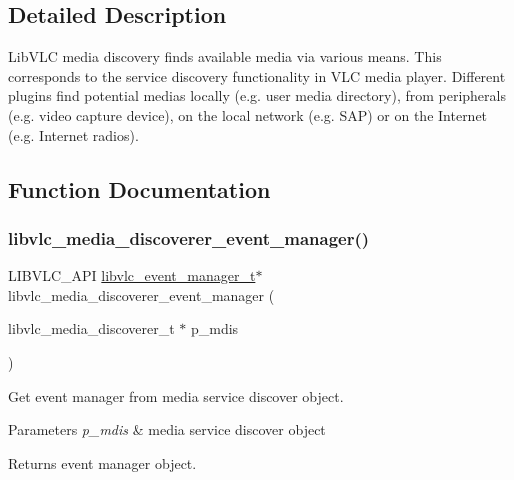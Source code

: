 \subsection{Detailed Description}
Lib\+V\+LC media discovery finds available media via various means. This corresponds to the service discovery functionality in V\+LC media player. Different plugins find potential medias locally (e.\+g. user media directory), from peripherals (e.\+g. video capture device), on the local network (e.\+g. S\+AP) or on the Internet (e.\+g. Internet radios). 

\subsection{Function Documentation}
\mbox{\label{group__libvlc__media__discoverer_ga60cca8ee74b3dd433f447436ca3e2578}} 
\subsubsection{\texorpdfstring{libvlc\+\_\+media\+\_\+discoverer\+\_\+event\+\_\+manager()}{libvlc\_media\_discoverer\_event\_manager()}}
{\footnotesize\ttfamily L\+I\+B\+V\+L\+C\+\_\+\+A\+PI \hyperlink{group__libvlc__event_gaa82f247503d3558b9117550e8d3c9259}{libvlc\+\_\+event\+\_\+manager\+\_\+t}$\ast$ libvlc\+\_\+media\+\_\+discoverer\+\_\+event\+\_\+manager (\begin{DoxyParamCaption}\item[{libvlc\+\_\+media\+\_\+discoverer\+\_\+t $\ast$}]{p\+\_\+mdis }\end{DoxyParamCaption})}

Get event manager from media service discover object.


\begin{DoxyParams}{Parameters}
{\em p\+\_\+mdis} & media service discover object \\
\hline
\end{DoxyParams}
\begin{DoxyReturn}{Returns}
event manager object. 
\end{DoxyReturn}
\mbox{\label{group__libvlc__media__discoverer_gaa4cd385d67fd8099a23209d2245ddd16}} 

